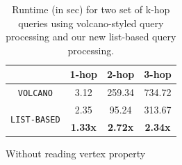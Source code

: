 \begin{table}
	\centering
		\centering
		\bgroup
		\setlength{\tabcolsep}{8pt}
		\def\arraystretch{1.2}%
		\begin{tabular}{ |c|c|c|c| }
			\hline
			& \textbf{1-hop} & \textbf{2-hop} & \textbf{3-hop} \\ 
			\hline \hline
			\texttt{VOLCANO}& 3.12 & 259.34 & 734.72 \\ 
			\hline
			\multirow{2}{*}{\texttt{LIST-BASED}}& 2.35 & 95.24 & 313.67 \\ 
			& \textbf{1.33x} & \textbf{2.72x} & \textbf{2.34x} \\ 
			\hline
		\end{tabular}
		\egroup
		\captionsetup{justification=centering}
		\caption{Without reading vertex property}
	\label{tbl:list-volcano}
	\captionsetup{justification=centering}
	\caption{Runtime (in sec) for two set of k-hop queries using volcano-styled query processing and our new list-based query processing.  }
\end{table}


















